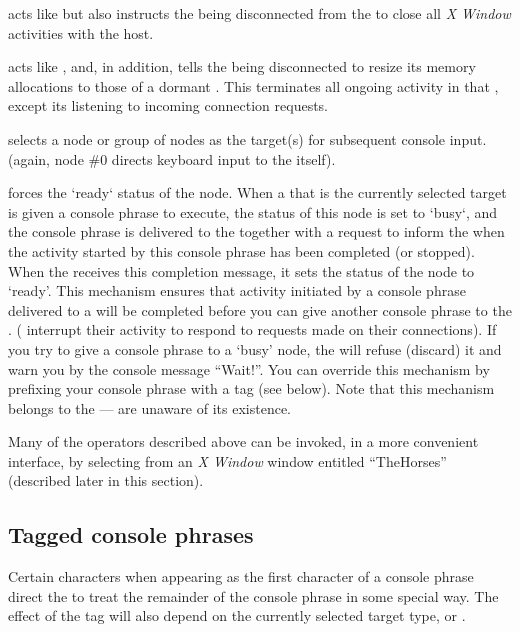  acts like  but also instructs the 
being disconnected from the  to close all \emph{X Window}
activities with the  host.

 acts like , and, in addition, tells the
 being disconnected to resize its memory allocations to
those of a dormant . This terminates all ongoing activity
in that , except its listening to incoming connection
requests.

 selects a node or group of nodes as the target(s) for
subsequent console input. (again, node \#$0$ directs keyboard input to
the  itself).

 forces the `ready` status of the node. When a 
that is the currently selected target is given a console phrase to
execute, the status of this node is set to `busy`, and the console
phrase is delivered to the  together with a request to
inform the  when the activity started by this console phrase
has been completed (or stopped). When the  receives this
completion message, it sets the status of the node to `ready'. This
mechanism ensures that activity initiated by a console phrase
delivered to a  will be completed before you can give
another console phrase to the . ( interrupt
their activity to respond to requests made on their connections). If
you try to give a console phrase to a `busy' node, the  will
refuse (discard) it and warn you by the console message ``Wait!''. You
can override this mechanism by prefixing your console phrase with a
tag (see below). Note that this mechanism belongs to the 
---  are unaware of its existence.

Many of the  operators described above can be invoked, in a more convenient interface, by selecting from an \emph{X Window} window entitled ``TheHorses'' (described later in this section).

\subsection{Tagged console phrases}

Certain characters when appearing as the first character of a console phrase direct the  to treat the remainder of the console phrase in some special way. The effect of the tag will also depend on the currently selected target type,  or .\\

